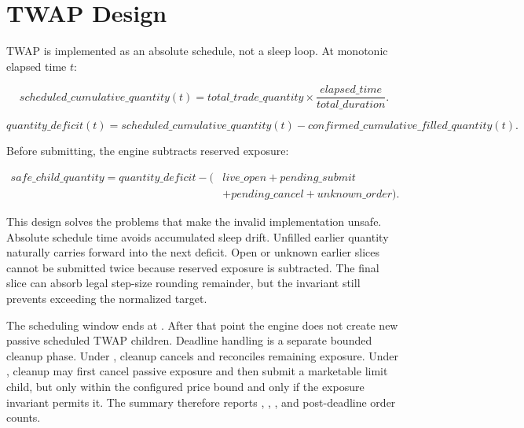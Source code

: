 \section{TWAP Design}

TWAP is implemented as an absolute schedule, not a sleep loop. At monotonic elapsed time \(t\):

\begin{equation}
  scheduled\_cumulative\_quantity(t)
  = total\_trade\_quantity \times \frac{elapsed\_time}{total\_duration}.
\end{equation}

\begin{equation}
  quantity\_deficit(t)
  = scheduled\_cumulative\_quantity(t) -
    confirmed\_cumulative\_filled\_quantity(t).
\end{equation}

Before submitting, the engine subtracts reserved exposure:

\begin{equation}
\begin{split}
safe\_child\_quantity = quantity\_deficit
 - (&live\_open + pending\_submit \\
&+ pending\_cancel + unknown\_order).
\end{split}
\end{equation}

This design solves the problems that make the invalid  implementation unsafe. Absolute schedule time avoids accumulated sleep drift. Unfilled earlier quantity naturally carries forward into the next deficit. Open or unknown earlier slices cannot be submitted twice because reserved exposure is subtracted. The final slice can absorb legal step-size rounding remainder, but the invariant still prevents exceeding the normalized target.

The scheduling window ends at . After that point the engine does not create new passive scheduled TWAP children. Deadline handling is a separate bounded cleanup phase. Under , cleanup cancels and reconciles remaining exposure. Under , cleanup may first cancel passive exposure and then submit a marketable limit child, but only within the configured price bound and only if the exposure invariant permits it. The summary therefore reports , , , and post-deadline order counts.

